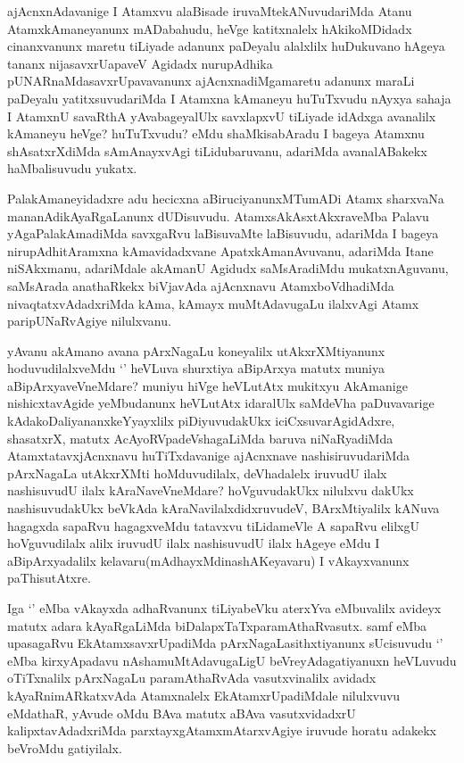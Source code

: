 \begin{artha}
ajAcnxnAdavanige I Atamxvu alaBisade iruvaMtekANuvudariMda Atanu AtamxkAmaneyanunx mADabahudu, heVge katitxnalelx hAkikoMDidadx cinanxvanunx maretu tiLiyade adanunx paDeyalu alalxlilx huDukuvano hAgeya tananx nijasavxrUapaveV Agidadx nurupAdhika pUNARnaMdasavxrUpavavanunx ajAcnxnadiMgamaretu adanunx maraLi paDeyalu yatitxsuvudariMda I Atamxna kAmaneyu huTuTxvudu nAyxya sahaja I AtamxnU savaRthA yAvabageyalUlx savxlapxvU tiLiyade idAdxga avanalilx kAmaneyu heVge? huTuTxvudu? eMdu shaMkisabAradu I bageya Atamxnu shAsatxrXdiMda sAmAnayxvAgi tiLidubaruvanu, adariMda avanalABakekx haMbalisuvudu yukatx. 

PalakAmaneyidadxre adu hecicxna aBiruciyanunxMTumADi Atamx sharxvaNa mananAdikAyaRgaLanunx dUDisuvudu. AtamxsAkAsxtAkxraveMba Palavu yAgaPalakAmadiMda savxgaRvu laBisuvaMte laBisuvudu, adariMda I bageya nirupAdhitAramxna kAmavidadxvane ApatxkAmanAvuvanu, adariMda Itane niSAkxmanu, adariMdale akAmanU Agidudx saMsAradiMdu mukatxnAguvanu, saMsArada anathaRkekx biVjavAda ajAcnxnavu AtamxboVdhadiMda nivaqtatxvAdadxriMda kAma, kAmayx muMtAdavugaLu ilalxvAgi Atamx paripUNaRvAgiye nilulxvanu.
\end{artha}

\begin{artha}
yAvanu akAmano avana pArxNagaLu koneyalilx utAkxrXMtiyanunx hoduvudilalxveMdu `\stext' heVLuva shurxtiya aBipArxya matutx muniya aBipArxyaveVneMdare? muniyu hiVge heVLutAtx mukitxyu AkAmanige nishicxtavAgide yeMbudanunx heVLutAtx idaralUlx saMdeVha paDuvavarige kAdakoDaliyananxkeYyayxlilx piDiyuvudakUkx iciCxsuvarAgidAdxre, shasatxrX, matutx AcAyoRVpadeVshagaLiMda baruva niNaRyadiMda AtamxtatavxjAcnxnavu huTiTxdavanige ajAcnxnave nashisiruvudariMda pArxNagaLa utAkxrXMti hoMduvudilalx, deVhadalelx iruvudU ilalx nashisuvudU ilalx kAraNaveVneMdare? hoVguvudakUkx nilulxvu dakUkx nashisuvudakUkx beVkAda kAraNavilalxdidxruvudeV, BArxMtiyalilx kANuva hagagxda sapaRvu hagagxveMdu tatavxvu tiLidameVle A sapaRvu elilxgU hoVguvudilalx alilx iruvudU ilalx nashisuvudU ilalx hAgeye eMdu I aBipArxyadalilx kelavaru(mAdhayxMdinashAKeyavaru) I vAkayxvanunx paThisutAtxre.
\end{artha}

\begin{artha}
Iga `\stext' eMba vAkayxda adhaRvanunx tiLiyabeVku aterxYva eMbuvalilx avideyx matutx adara kAyaRgaLiMda biDalapxTaTxparamAthaRvasutx. samf eMba upasagaRvu EkAtamxsavxrUpadiMda pArxNagaLasithxtiyanunx sUcisuvudu `\stext' eMba kirxyApadavu nAshamuMtAdavugaLigU beVreyAdagatiyanuxn heVLuvudu oTiTxnalilx pArxNagaLu paramAthaRvAda vasutxvinalilx avidadx kAyaRnimARkatxvAda Atamxnalelx EkAtamxrUpadiMdale nilulxvuvu eMdathaR, yAvude oMdu BAva matutx aBAva vasutxvidadxrU kalipxtavAdadxriMda parxtayxgAtamxmAtarxvAgiye iruvude horatu adakekx beVroMdu gatiyilalx. 
\end{artha}

